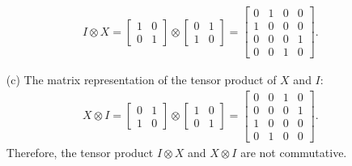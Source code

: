 \documentclass[en]{sol-man}
\begin{document}
\begin{sol}
\begin{itemize}
        \begin{align}
            I\otimes X=\left[\begin{matrix}
                1&0\\
                0&1
            \end{matrix}\right]\otimes\left[\begin{matrix}
                0&1\\
                1&0
            \end{matrix}\right]=\left[\begin{matrix}
                0&1&0&0\\
                1&0&0&0\\
                0&0&0&1\\
                0&0&1&0
            \end{matrix}\right].
        \end{align}
        \item[(c)] The matrix representation of the tensor product of $X$ and $I$:
        \begin{align}
            X\otimes I=\left[\begin{matrix}
                0&1\\
                1&0
            \end{matrix}\right]\otimes\left[\begin{matrix}
                1&0\\
                0&1
            \end{matrix}\right]=\left[\begin{matrix}
                0&0&1&0\\
                0&0&0&1\\
                1&0&0&0\\
                0&1&0&0
            \end{matrix}\right].
        \end{align}
        Therefore, the tensor product $I\otimes X$ and $X\otimes I$ are not commutative.
    \end{itemize}
\end{sol}
\end{document}

